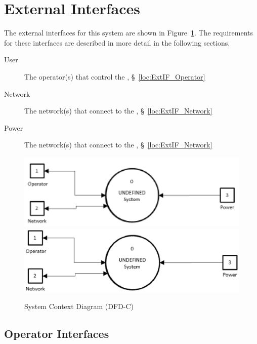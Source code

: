 \newpage
\section{External Interfaces}
\label{loc:ExternalInterfaces}


The external interfaces for this system are shown in Figure~\ref{fig:DFD-C}.
The requirements for these interfaces are described in more detail in the following sections.
\begin{description}
	\item[User] The operator(s) that control the \ThisSys, \S~\ref{loc:ExtIF_Operator}
	\item[Network] The network(s) that connect to the \ThisSys, \S~\ref{loc:ExtIF_Network}
	\item[Power] The network(s) that connect to the \ThisSys, \S~\ref{loc:ExtIF_Network}
\end{description}
\begin{figure}[htbp]
	\centering
		\ifpdf
						\includegraphics[width=6.5in]{../zProjectWideData/images/DFD-C_Image.pdf}
		\else
				\includegraphics[width=6.5in]{../zProjectWideData/images/DFD-C_300dpi_6.5inchesWide.eps}
		\fi
	\caption[System Context Diagram]{System Context Diagram (DFD-C)}
	\label{fig:DFD-C}
\end{figure}

\KNEADSUBSECTIONNEWPAGE
\subsection{Operator Interfaces}
\label{loc:ExtIF_Operator}

